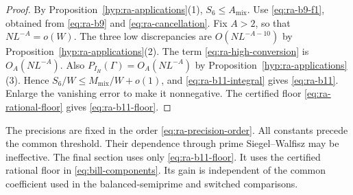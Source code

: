 \begin{proof}
By Proposition~\ref{hyp:ra-applications}(1), \(S_6\le A_{\mathrm{mix}}\).
Use \eqref{eq:ra-b9-f1}, obtained from \eqref{eq:ra-b9} and
\eqref{eq:ra-cancellation}. Fix \(A>2\), so that \(NL^{-A}=o(W)\). The
three low discrepancies are \(O(NL^{-A-10})\) by
Proposition~\ref{hyp:ra-applications}(2).
The term
\eqref{eq:ra-high-conversion} is \(O_A(NL^{-A})\).
Also \(P_{I_H}(\Gamma)=O_A(NL^{-A})\) by
Proposition~\ref{hyp:ra-applications}(3). Hence
\(S_6/W\le M_{\mathrm{mix}}/W+o(1)\), and \eqref{eq:ra-b11-integral} gives
\eqref{eq:ra-b11}. Enlarge the vanishing error to make it nonnegative. The
certified floor \eqref{eq:ra-rational-floor} gives \eqref{eq:ra-b11-floor}.
\end{proof}

The precisions are fixed in the order \eqref{eq:ra-precision-order}.
All constants precede the common threshold.
Their dependence through prime Siegel--Walfisz may be ineffective.
The final section uses only \eqref{eq:ra-b11-floor}.
It uses the certified rational floor in \eqref{eq:bill-components}.
Its gain is independent of the common coefficient used in the
balanced-semiprime and switched comparisons.
